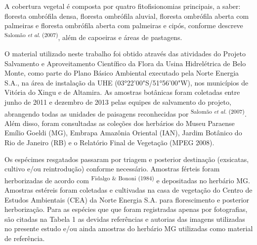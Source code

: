 \begin{multicols}{2}
{}
\par
\par{}A cobertura vegetal é composta por quatro fitofisionomias principais,\allowbreak{} a saber:\allowbreak{} floresta ombrófila densa,\allowbreak{} floresta ombrófila aluvial,\allowbreak{} floresta ombrófila aberta com palmeiras e floresta ombrófila aberta com palmeiras e cipós,\allowbreak{} conforme descreve \textsuperscript{Salomão \textit{et al}.\allowbreak{} (\allowbreak{}2007)\allowbreak{}},\allowbreak{} além de capoeiras e áreas de pastagens.\allowbreak{} \par{}O material utilizado neste trabalho foi obtido através das atividades do Projeto Salvamento e Aproveitamento Científico da Flora da Usina Hidrelétrica de Belo Monte,\allowbreak{} como parte do Plano Básico Ambiental executado pela Norte Energia S.\allowbreak{}A.\allowbreak{},\allowbreak{} na área de instalação da UHE (\allowbreak{}03°22'00"S\fshyp{}51°56'00"W)\allowbreak{},\allowbreak{} nos municípios de Vitória do Xingu e de Altamira.\allowbreak{} As amostras botânicas foram coletadas entre junho de 2011 e dezembro de 2013 pelas equipes de salvamento do projeto,\allowbreak{} abrangendo todas as unidades de paisagens reconhecidas por \textsuperscript{Salomão \textit{et al.\allowbreak{}} (\allowbreak{}2007)\allowbreak{}}.\allowbreak{} Além disso,\allowbreak{} foram consultadas as coleções dos herbários do Museu Paraense Emílio Goeldi (\allowbreak{}MG)\allowbreak{},\allowbreak{} Embrapa Amazônia Oriental (\allowbreak{}IAN)\allowbreak{},\allowbreak{} Jardim Botânico do Rio de Janeiro (\allowbreak{}RB)\allowbreak{} e o Relatório Final de Vegetação (\allowbreak{}MPEG 2008)\allowbreak{}.\allowbreak{} \par{}Os espécimes resgatados passaram por triagem e posterior destinação (\allowbreak{}exsicatas,\allowbreak{} cultivo e\fshyp{}ou reintrodução)\allowbreak{} conforme necessário.\allowbreak{} Amostras férteis foram herborizadas de acordo com \textsuperscript{Fidalgo \&\allowbreak{\allowbreak{}\allowbreak{}}\allowbreak{} Bononi (\allowbreak{}1984)\allowbreak{}} e depositadas no herbário MG.\allowbreak{} Amostras estéreis foram coletadas e cultivadas na casa de vegetação do Centro de Estudos Ambientais (\allowbreak{}CEA)\allowbreak{} da Norte Energia S.\allowbreak{}A.\allowbreak{} para florescimento e posterior herborização.\allowbreak{} Para as espécies que que foram registradas apenas por fotografias,\allowbreak{} são citadas na Tabela 1 as devidas referências e autorias das imagens utilizadas no presente estudo e\fshyp{}ou ainda amostras do herbário MG utilizadas como material de referência.\allowbreak{}\end{multicols}
